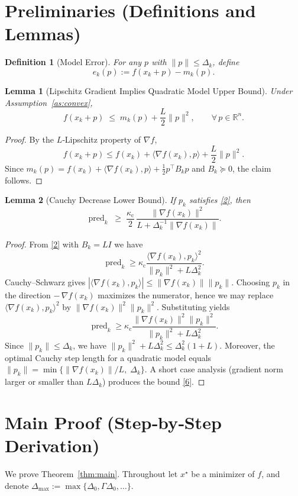 \documentclass{article}
\newtheorem{lemma}{Lemma}
\newtheorem{definition}{Definition}
\newcommand{\inner}[2]{\langle #1,#2\rangle}
\begin{document}
\section*{Preliminaries (Definitions and Lemmas)}
\begin{definition}[Model Error]\label{def:model_error}
For any $p$ with $\|p\|\le\Delta_k$, define
\[
e_k(p):=f(x_k+p)-m_k(p).
\]
\end{definition}
\begin{lemma}[Lipschitz Gradient Implies Quadratic Model Upper Bound]\label{lem:model_upper}
Under Assumption~\ref{as:convex},
\[
f(x_k+p)\;\le\; m_k(p)+\frac{L}{2}\|p\|^{2},
\qquad\forall\,p\in\mathbb{R}^{n}.
\]
\end{lemma}
\begin{proof}
By the $L$‑Lipschitz property of $\nabla f$,
\[
f(x_k+p)\le f(x_k)+\inner{\nabla f(x_k)}{p}+\frac{L}{2}\|p\|^{2}.
\]
Since $m_k(p)=f(x_k)+\inner{\nabla f(x_k)}{p}+\tfrac12 p^{\top}B_kp$ and $B_k\succeq 0$,
the claim follows. \hfill\qedhere
\end{proof}
\begin{lemma}[Cauchy Decrease Lower Bound]\label{lem:cauchy}
If $p_k$ satisfies \eqref{2}, then
\[
\operatorname{pred}_k
\;\ge\;
\frac{\kappa_{\mathrm{c}}}{2}\,
\frac{\|\nabla f(x_k)\|^{2}}{L+\Delta_k^{-1}\|\nabla f(x_k)\|}.
\tag{6}
\]
\end{lemma}
\begin{proof}
From \eqref{2} with $B_k=L I$ we have
\[
\operatorname{pred}_k
\ge\kappa_{\mathrm{c}}
\frac{\inner{\nabla f(x_k)}{p_k}^{2}}{\|p_k\|^{2}+L\Delta_k^{2}}.
\]
Cauchy–Schwarz gives $|\inner{\nabla f(x_k)}{p_k}|\le\|\nabla f(x_k)\|\|p_k\|$.
Choosing $p_k$ in the direction $-\,\nabla f(x_k)$ maximizes the numerator,
hence we may replace $\inner{\nabla f(x_k)}{p_k}^{2}$ by
$\|\nabla f(x_k)\|^{2}\|p_k\|^{2}$.  Substituting yields
\[
\operatorname{pred}_k\ge
\kappa_{\mathrm{c}}
\frac{\|\nabla f(x_k)\|^{2}\|p_k\|^{2}}
{\|p_k\|^{2}+L\Delta_k^{2}}.
\]
Since $\|p_k\|\le\Delta_k$, we have $\|p_k\|^{2}+L\Delta_k^{2}\le
\Delta_k^{2}(1+L)$.  Moreover, the optimal Cauchy step length for a
quadratic model equals $\|p_k\|=\min\{\|\nabla f(x_k)\|/L,\;\Delta_k\}$.
A short case analysis (gradient norm larger or smaller than $L\Delta_k$)
produces the bound \eqref{6}. \hfill\qedhere
\end{proof}

\section*{Main Proof (Step‑by‑Step Derivation)}
We prove Theorem~\ref{thm:main}.  Throughout let $x^{\star}$ be a minimizer of $f$,
and denote $\Delta_{\max}:=\max\{\Delta_0,\Gamma\Delta_0,\dots\}$.
\end{document}
